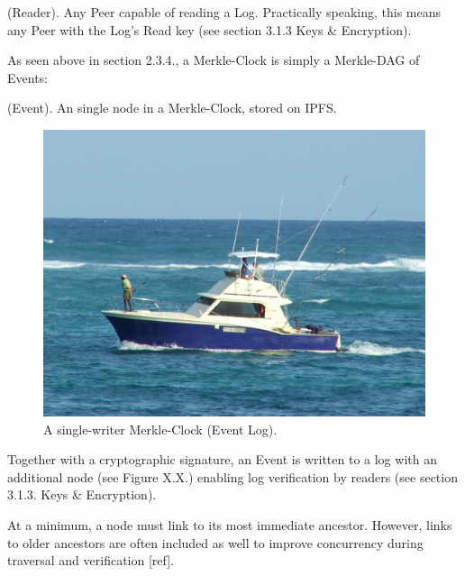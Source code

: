 \documentclass{comjnl}
\begin{document}
\begin{definition}
(Reader). Any Peer capable of reading a Log. Practically speaking, this means any Peer with the Log’s Read key (see section 3.1.3 Keys \& Encryption).
\end{definition}


As seen above in section 2.3.4., a Merkle-Clock is simply a Merkle-DAG of Events:

\begin{definition}
 (Event). An single node in a Merkle-Clock, stored on IPFS.
\end{definition}

\begin{figure}
  \includegraphics[width=\linewidth]{boat.jpg}
  \caption{A single-writer Merkle-Clock (Event Log).}
  \label{fig:boat1}
\end{figure}

Together with a cryptographic signature, an Event is written to a log with an additional node (see Figure X.X.) enabling log verification by readers (see section 3.1.3. Keys \& Encryption).

At a minimum, a node must link to its most immediate ancestor. However, links to older ancestors are often included as well to improve concurrency during traversal and verification [ref].
\end{document}

